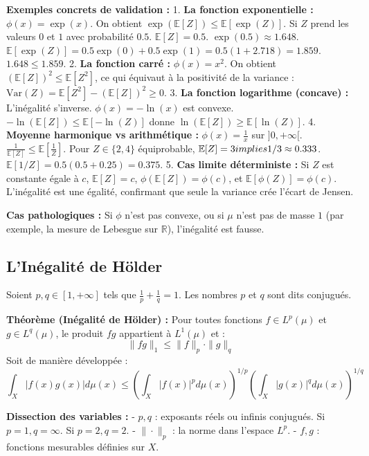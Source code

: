 \documentclass[11pt,a4paper]{article}
\begin{document}
\textbf{Exemples concrets de validation :}
1. \textbf{La fonction exponentielle :} $\phi(x) = \exp(x)$. On obtient $\exp(\mathbb{E}[Z]) \le \mathbb{E}[\exp(Z)]$. Si $Z$ prend les valeurs $0$ et $1$ avec probabilité $0.5$. $\mathbb{E}[Z] = 0.5$. $\exp(0.5) \approx 1.648$. $\mathbb{E}[\exp(Z)] = 0.5 \exp(0) + 0.5 \exp(1) = 0.5(1 + 2.718) = 1.859$. $1.648 \le 1.859$.
2. \textbf{La fonction carré :} $\phi(x) = x^2$. On obtient $(\mathbb{E}[Z])^2 \le \mathbb{E}[Z^2]$, ce qui équivaut à la positivité de la variance : $\text{Var}(Z) = \mathbb{E}[Z^2] - (\mathbb{E}[Z])^2 \ge 0$.
3. \textbf{La fonction logarithme (concave) :} L'inégalité s'inverse. $\phi(x) = -\ln(x)$ est convexe. $-\ln(\mathbb{E}[Z]) \le \mathbb{E}[-\ln(Z)]$ donne $\ln(\mathbb{E}[Z]) \ge \mathbb{E}[\ln(Z)]$.
4. \textbf{Moyenne harmonique vs arithmétique :} $\phi(x) = \frac{1}{x}$ sur $]0, +\infty[$. $\frac{1}{\mathbb{E}[Z]} \le \mathbb{E}[\frac{1}{Z}]$. Pour $Z \in \{2, 4\}$ équiprobable, $\mathbb{E}[Z] = 3 \\implies 1/3 \approx 0.333$. $\mathbb{E}[1/Z] = 0.5(0.5 + 0.25) = 0.375$.
5. \textbf{Cas limite déterministe :} Si $Z$ est constante égale à $c$, $\mathbb{E}[Z] = c$, $\phi(\mathbb{E}[Z]) = \phi(c)$, et $\mathbb{E}[\phi(Z)] = \phi(c)$. L'inégalité est une égalité, confirmant que seule la variance crée l'écart de Jensen.

\textbf{Cas pathologiques :} Si $\phi$ n'est pas convexe, ou si $\mu$ n'est pas de masse $1$ (par exemple, la mesure de Lebesgue sur $\mathbb{R}$), l'inégalité est fausse.

\subsection{L'Inégalité de Hölder}

Soient $p, q \in [1, +\infty]$ tels que $\frac{1}{p} + \frac{1}{q} = 1$. Les nombres $p$ et $q$ sont dits conjugués.

\textbf{Théorème (Inégalité de Hölder) :}
Pour toutes fonctions $f \in L^p(\mu)$ et $g \in L^q(\mu)$, le produit $fg$ appartient à $L^1(\mu)$ et :
$$ \|fg\|_1 \le \|f\|_p \cdot \|g\|_q $$
Soit de manière développée :
$$ \int_X |f(x)g(x)| d\mu(x) \le \left( \int_X |f(x)|^p d\mu(x) \right)^{1/p} \left( \int_X |g(x)|^q d\mu(x) \right)^{1/q} $$

\textbf{Dissection des variables :}
- $p, q$ : exposants réels ou infinis conjugués. Si $p=1, q=\infty$. Si $p=2, q=2$.
- $\| \cdot \|_p$ : la norme dans l'espace $L^p$.
- $f, g$ : fonctions mesurables définies sur $X$.
\end{document}
